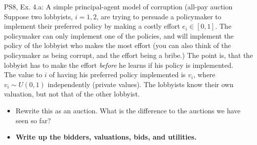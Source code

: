 \begin{frame}{PS8, Ex. 4.a: A simple principal-agent model of corruption (all-pay auction}
    Suppose two lobbyists, $i = 1, 2$, are trying to persuade a policymaker to implement their preferred policy by making a costly effort $e_i\in[0, 1]$. The policymaker can only implement one of the policies, and will implement the policy of the lobbyist who makes the most effort (you can also think of the policymaker as being corrupt, and the effort being a bribe.) The point is, that the lobbyist has to make the effort \textit{before} he learns if his policy is implemented.\\\medskip
    The value to $i$ of having his preferred policy implemented is $v_i$, where $v_i\sim U(0, 1)$ independently (private values). The lobbyists know their own valuation, but not that of the other lobbyist.
    \begin{itemize}
      \item[(a)] Rewrite this as an auction. What is the difference to the auctions we have seen so far?
    \end{itemize}
    \vspace{-8pt}
    \begin{multicols}{2}
      \begin{itemize}
        \item[Step 1:] \textbf{Write up the bidders, valuations, bids, and utilities.}
      \end{itemize}
      \vfill\null\columnbreak
      \vfill\null
    \end{multicols}
\end{frame}
